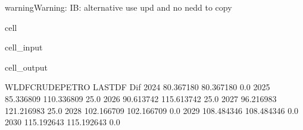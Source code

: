 \documentclass[letterpaper,10pt,english]{jupyterBook}
\begin{document}
\begin{sphinxadmonition}{warning}{Warning:}
\sphinxAtStartPar
IB: alternative use upd and no nedd to copy
\end{sphinxadmonition}

\begin{sphinxuseclass}{cell}\begin{sphinxVerbatimInput}

\begin{sphinxuseclass}{cell_input}
\begin{sphinxVerbatim}[commandchars=\\\{\}]

\PYG{p}{[}\PYG{p}{[}\PYG{p}{]}\PYG{p}{]}
\PYG{p}{[}\PYG{p}{]}\PYG{p}{[}\PYG{p}{[}\PYG{p}{]}\PYG{p}{]}
\PYG{p}{[}\PYG{p}{]}\PYG{p}{[}\PYG{p}{]}\PYG{p}{[}\PYG{p}{]}

\PYG{p}{[}\PYG{p}{]}
\end{sphinxVerbatim}

\end{sphinxuseclass}\end{sphinxVerbatimInput}
\begin{sphinxVerbatimOutput}

\begin{sphinxuseclass}{cell_output}
\begin{sphinxVerbatim}[commandchars=\\\{\}]
      WLDFCRUDE\PYGZus{}PETRO      LASTDF   Dif
2024        80.367180   80.367180   0.0
2025        85.336809  110.336809  25.0
2026        90.613742  115.613742  25.0
2027        96.216983  121.216983  25.0
2028       102.166709  102.166709   0.0
2029       108.484346  108.484346   0.0
2030       115.192643  115.192643   0.0
\end{sphinxVerbatim}

\end{sphinxuseclass}\end{sphinxVerbatimOutput}

\end{sphinxuseclass}
\end{document}
